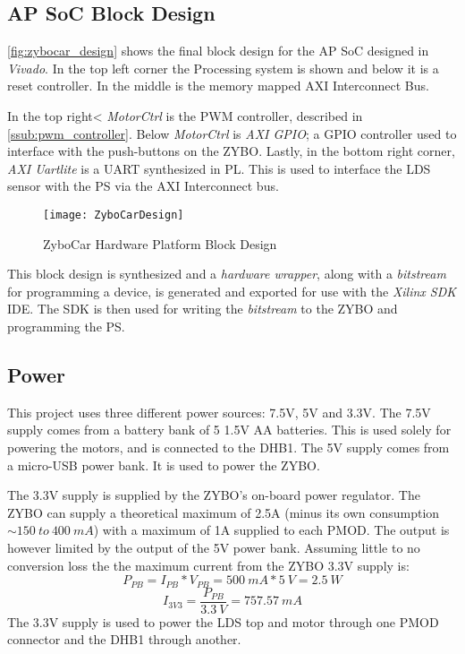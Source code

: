 \documentclass[Main]{subfiles}
\begin{document}
		

	\subsection{AP SoC Block Design} %
	\label{sub:ap_soc_block_design}

		\autoref{fig:zybocar_design} shows the final block design for the AP SoC designed in \emph{Vivado}.
		In the top left corner the Processing system is shown and below it is a reset controller. 
		In the middle is the memory mapped AXI Interconnect Bus.

		In the top right< \emph{MotorCtrl} is the PWM controller, described in \autoref{ssub:pwm_controller}.
		Below \emph{MotorCtrl} is \emph{AXI GPIO}; a GPIO controller used to interface with the push-buttons on the ZYBO.
		Lastly, in the bottom right corner, \emph{AXI Uartlite} is a UART synthesized in PL.
		This is used to interface the LDS sensor with the PS via the AXI Interconnect bus.

		\begin{figure}[H]
			\centering
			\texttt{[image: ZyboCarDesign]}
			\caption{ZyboCar Hardware Platform Block Design}
			\label{fig:zybocar_design}
		\end{figure}
		This block design is synthesized and a \emph{hardware wrapper}, along with a \emph{bitstream} for programming a device, is generated and exported for use with the \emph{Xilinx SDK} IDE.
		The SDK is then used for writing the \emph{bitstream} to the ZYBO and programming the PS. 


	\subsection{Power} %
	\label{sub:power}

		This project uses three different power sources: 7.5V, 5V and 3.3V.
		The 7.5V supply comes from a battery bank of 5 1.5V AA batteries.
		This is used solely for powering the motors, and is connected to the DHB1.
		The 5V supply comes from a micro-USB power bank. 
		It is used to power the ZYBO.

		The 3.3V supply is supplied by the ZYBO's on-board power regulator.
		The ZYBO can supply a theoretical maximum of 2.5A (minus its own consumption $\sim150\ to\ 400\ mA$) with a maximum of 1A supplied to each PMOD.
		The output is however limited by the output of the 5V power bank.
		Assuming little to no conversion loss the the maximum current from the ZYBO 3.3V supply is:
		\begin{equation}
			P_{PB} = I_{PB} * V_{PB} = 
			500\ mA * 5\ V =
			2.5\ W
		\end{equation}
		\begin{equation}
			I_{3V3} = 
			\frac{P_{PB}}{3.3\ V} =
			757.57\ mA
		\end{equation}
		The 3.3V supply is used to power the LDS top and motor through one PMOD connector and the DHB1 through another.


\end{document}
